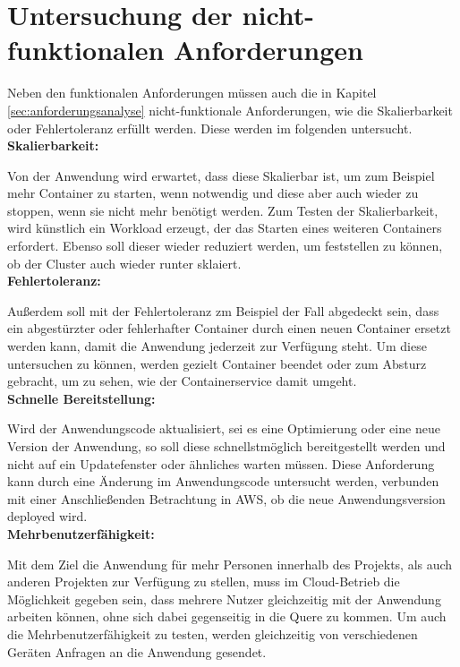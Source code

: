 \section{Untersuchung der nicht-funktionalen Anforderungen}
Neben den funktionalen Anforderungen müssen auch die in Kapitel \ref{sec:anforderungsanalyse} nicht-funktionale Anforderungen, wie die Skalierbarkeit oder Fehlertoleranz erfüllt werden. Diese werden im folgenden untersucht. \\

\textbf{Skalierbarkeit:}

Von der Anwendung wird erwartet, dass diese Skalierbar ist, um zum Beispiel mehr Container zu starten, wenn notwendig und diese aber auch wieder zu stoppen, wenn sie nicht mehr benötigt werden. Zum Testen der Skalierbarkeit, wird künstlich ein Workload erzeugt, der das Starten eines weiteren Containers erfordert. Ebenso soll dieser wieder reduziert werden, um feststellen zu können, ob der Cluster auch wieder runter sklaiert. \\

\textbf{Fehlertoleranz:}

Außerdem soll mit der Fehlertoleranz zm Beispiel der Fall abgedeckt sein, dass ein abgestürzter oder fehlerhafter Container durch einen neuen Container ersetzt werden kann, damit die Anwendung jederzeit zur Verfügung steht. Um diese untersuchen zu können, werden gezielt Container beendet oder zum Absturz gebracht, um zu sehen, wie der Containerservice damit umgeht. \\

\textbf{Schnelle Bereitstellung:}

Wird der Anwendungscode aktualisiert, sei es eine Optimierung oder eine neue Version der Anwendung, so soll diese schnellstmöglich bereitgestellt werden und nicht auf ein Updatefenster oder ähnliches warten müssen. Diese Anforderung kann durch eine Änderung im Anwendungscode untersucht werden, verbunden mit einer Anschließenden Betrachtung in \ac{AWS}, ob die neue Anwendungsversion deployed wird. \\

\textbf{Mehrbenutzerfähigkeit:}

Mit dem Ziel die Anwendung für mehr Personen innerhalb des Projekts, als auch anderen Projekten zur Verfügung zu stellen, muss im Cloud-Betrieb die Möglichkeit gegeben sein, dass mehrere Nutzer gleichzeitig mit der Anwendung arbeiten können, ohne sich dabei gegenseitig in die Quere zu kommen. Um auch die Mehrbenutzerfähigkeit zu testen, werden gleichzeitig von verschiedenen Geräten Anfragen an die Anwendung gesendet. \pagebreak

